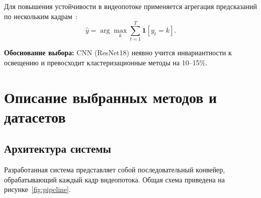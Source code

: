 \documentclass[10pt,a4paper]{report}
\numberwithin{equation}{chapter}
\numberwithin{figure}{chapter}
\numberwithin{table}{chapter}
\begin{document}
Для повышения устойчивости в видеопотоке применяется агрегация предсказаний
по нескольким кадрам~\cite{kubatin2019}:
\begin{equation}
  \hat{y} = \arg\max_{k}\sum_{t=1}^{T} \mathbf{1}[y_t = k].
\end{equation}

\noindent\textbf{Обоснование выбора:} CNN (ResNet18) неявно учится
инвариантности к освещению и превосходит кластеризационные методы на 10--15\%.

\chapter{Описание выбранных методов и датасетов}

\section{Архитектура системы}

Разработанная система представляет собой последовательный конвейер,
обрабатывающий каждый кадр видеопотока. Общая схема приведена
на рисунке~\ref{fig:pipeline}.
\end{document}
